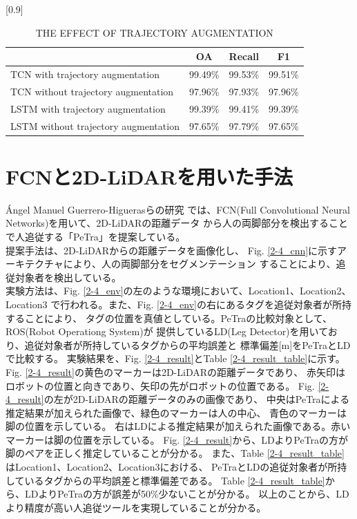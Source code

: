\begin{table}[b]
  \begin{center}
    \caption{{THE EFFECT OF TRAJECTORY AUGMENTATION\cite{Temporal convolutional networks for multi-person activity recognition using a 2D LIDAR}}
    \label{2-2_THE EFFECT OF TRAJECTORY AUGMENTATION}}
    \scalebox{1.0}[0.9]{
      \begin{tabular}{l|c|c|c} \hline
        & OA & Recall & F1 \\ \hline
        TCN with trajectory augmentation & 99.49\% & 99.53\% & 99.51\% \\ \hline
        TCN without trajectory augmentation & 97.96\% & 97.93\% & 97.96\% \\ \hline
        LSTM with trajectory augmentation & 99.39\% & 99.41\% & 99.39\% \\ \hline
        LSTM without trajectory augmentation & 97.65\% & 97.79\% & 97.65\% \\ \hline
      \end{tabular}
    }
  \end{center}
\end{table}

\clearpage

\section{FCNと2D-LiDARを用いた手法}
Ángel Manuel Guerrero-Higuerasらの研究
\cite{Tracking People in a Mobile Robot From 2D LIDAR Scans Using Full Convolutional Neural Networks for Security in Cluttered Environments}
では、FCN(Full Convolutional Neural Networks)を用いて、2D-LiDARの距離データ
から人の両脚部分を検出することで人追従する「PeTra」を提案している。\\ \indent
提案手法は、2D-LiDARからの距離データを画像化し、
Fig. \ref{2-4_cnn}に示すアーキテクチャにより、人の両脚部分をセグメンテーション
することにより、追従対象者を検出している。\\ \indent
実験方法は、Fig. \ref{2-4_env}の左のような環境において、Location1、Location2、Location3
で行われる。また、Fig. \ref{2-4_env}の右にあるタグを追従対象者が所持することにより、
タグの位置を真値としている。PeTraの比較対象として、ROS(Robot Operationg System)が
提供しているLD(Leg Detector)を用いており、追従対象者が所持しているタグからの平均誤差と
標準偏差[m]をPeTraとLDで比較する。
実験結果を、Fig. \ref{2-4_result}とTable \ref{2-4_result_table}に示す。
Fig. \ref{2-4_result}の黄色のマーカーは2D-LiDARの距離データであり、
赤矢印はロボットの位置と向きであり、矢印の先がロボットの位置である。
Fig. \ref{2-4_result}の左が2D-LiDARの距離データのみの画像であり、
中央はPeTraによる推定結果が加えられた画像で、緑色のマーカーは人の中心、
青色のマーカーは脚の位置を示している。
右はLDによる推定結果が加えられた画像である。赤いマーカーは脚の位置を示している。
Fig. \ref{2-4_result}から、LDよりPeTraの方が脚のペアを正しく推定していることが分かる。
また、Table \ref{2-4_result_table}はLocation1、Location2、Location3における、
PeTraとLDの追従対象者が所持しているタグからの平均誤差と標準偏差である。
Table \ref{2-4_result_table}から、LDよりPeTraの方が誤差が50\%少ないことが分かる。
以上のことから、LDより精度が高い人追従ツールを実現していることが分かる。


